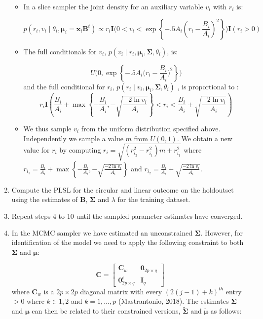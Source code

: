 \documentclass[11pt,]{article}
\begin{document}
\begin{appendices}
\begin{enumerate}
\begin{itemize}
\item In a slice sampler the joint density for an auxiliary variable $v_{i}$ with $r_{i}$ is:

$$p(r_{i}, v_{i}\mid \theta_{i}, \boldsymbol{\mu}_{i}=\boldsymbol{x}_{i}\boldsymbol{B}^{t}) \propto r_{i} \textbf{I}\bigg(0 < v_i < \exp\left\{ -.5 A_i(r_{i} - \frac{B_i}{A_i})^2\right\}\bigg)\textbf{I}(r_i > 0)$$

\item The full conditionals for $v_{i}$, $p(v_{i} \mid r_{i},\boldsymbol{\mu}_{i}, \boldsymbol{\Sigma}, \theta_{i})$, is:

$$U\Bigg(0, \exp\left\{-.5A_i\bigg(r_i -  \frac{B_{i}}{A_i}\bigg)^2\right\}\Bigg)$$
and the full conditional for $r_i$, $p(r_{i} \mid v_{i},\boldsymbol{\mu}_{i}, \boldsymbol{\Sigma}, \theta_{i})$ , is proportional to :
$$r_{i} \textbf{I}\left(\frac{B_i}{A_i} + \max\left\{-\frac{B_i}{A_i}, -\sqrt{\frac{-2\ln v_{i}}{A_i}}\right\} < r_{i} < \frac{B_i}{A_i} + \sqrt{\frac{-2\ln v_{i}}{A_i}}\right)$$
\item We thus sample $v_{i}$ from the uniform distribution specified above. Independently we sample a value $m$ from $U(0,1)$. We obtain a new value for $r_{i}$ by computing $r_{i} = \sqrt{(r_{i_{2}}^{2}-r_{i_{1}}^{2})m + r_{i_{1}}^{2}}$ where $r_{i_{1}}=\frac{B_i}{A_i} +\max\left\{-\frac{B_i}{A_i}, -\sqrt{\frac{-2\ln v_{i}}{A_i}}\right\}$ and $ r_{i_{2}}= \frac{B_i}{A_i} + \sqrt{\frac{-2\ln v_{i}}{A_i}}$.

\end{itemize}

\item Compute the PLSL for the circular and linear outcome on the holdoutset using the estimates of $\boldsymbol{B}$, $\boldsymbol{\Sigma}$ and $\lambda$ for the training dataset.

\item Repeat steps 4 to 10 until the sampled parameter estimates have converged.

\item In the MCMC sampler we have estimated an unconstrained $\boldsymbol{\Sigma}$. However, for identification of the model we need to apply the following constraint to both $\boldsymbol{\Sigma}$ and $\boldsymbol{\mu}$:

$$\boldsymbol{C} = \begin{bmatrix} \boldsymbol{C}_w & \boldsymbol{0}_{2p \times q} \\ \boldsymbol{0}_{2p \times q}^t & \boldsymbol{I}_q \end{bmatrix}$$
where $\boldsymbol{C}_w$ is a $2p \times 2p$ diagonal matrix with every $(2(j-1) + k)^{th}$ entry $> 0$ where $k \in 1, 2$ and $k = 1, \dots, p$ (Mastrantonio, 2018). The estimates $\boldsymbol{\Sigma}$ and $\boldsymbol{\mu}$ can then be related to their constrained versions, $\tilde{\boldsymbol{\Sigma}}$ and $\tilde{\boldsymbol{\mu}}$ as follows:


\end{enumerate}
\end{appendices}
\end{document}
